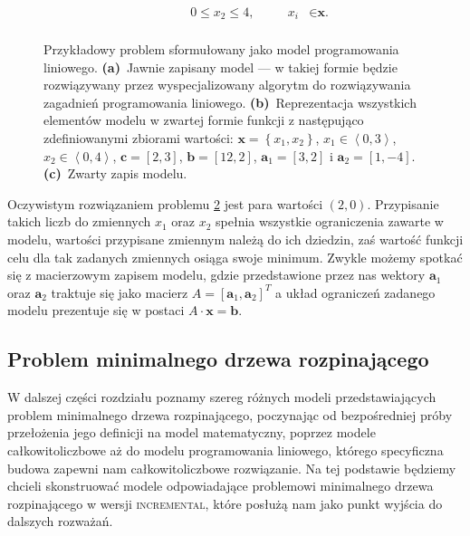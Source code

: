 \begin{figure}[!htbp]
\begin{subfigure}[b]{0.3\textwidth}
\begin{subequations}
\begin{alignat*}{4}
			& & & \phantom{\sum} 0 \leqslant x_{2} \leqslant 4, &\quad & x_{i} &\in \textbf{x}\textrm{.} \\
			\end{alignat*}
		\end{subequations}
		\caption{}
		\label{fig:lpexample:c}
	\end{subfigure}
	\hfill\null
	\caption{
		Przykładowy problem sformułowany jako model programowania liniowego.
		\textbf{(a)}~Jawnie zapisany model --- w takiej formie będzie rozwiązywany przez wyspecjalizowany algorytm do rozwiązywania zagadnień programowania liniowego.
		\textbf{(b)}~Reprezentacja wszystkich elementów modelu w zwartej formie funkcji z następująco zdefiniowanymi zbiorami wartości: $\textbf{x} = \left\{ x_{1}, x_{2} \right\}$, $x_{1} \in \left\langle 0, 3 \right\rangle$, $x_{2} \in \left\langle 0, 4 \right\rangle$, $\textbf{c} = \left[ 2, 3 \right]$, $\textbf{b} = \left[ 12, 2 \right]$, $\textbf{a}_{1} = \left[ 3, 2 \right]$ i $\textbf{a}_{2} = \left[ 1, -4 \right]$.
		\textbf{(c)}~Zwarty zapis modelu.
	}
	\label{fig:lpexample}
\end{figure}

Oczywistym rozwiązaniem problemu \ref{fig:lpexample} jest para wartości $\left( 2, 0 \right)$. Przypisanie takich liczb do zmiennych $x_{1}$ oraz $x_{2}$ spełnia wszystkie ograniczenia zawarte w modelu, wartości przypisane zmiennym należą do ich dziedzin, zaś wartość funkcji celu dla tak zadanych zmiennych osiąga swoje minimum. Zwykle możemy spotkać się z macierzowym zapisem modelu, gdzie przedstawione przez nas wektory $\textbf{a}_{1}$ oraz $\textbf{a}_{2}$ traktuje się jako macierz $A = \left[ \textbf{a}_{1}, \textbf{a}_{2} \right]^{T}$ a układ ograniczeń zadanego modelu prezentuje się w postaci $A \cdot \textbf{x} = \textbf{b}$.

\subsection{Problem minimalnego drzewa rozpinającego}

W dalszej części rozdziału poznamy szereg różnych modeli przedstawiających problem minimalnego drzewa rozpinającego, poczynając od bezpośredniej próby przełożenia jego definicji na model matematyczny, poprzez modele całkowitoliczbowe aż do modelu programowania liniowego, którego specyficzna budowa zapewni nam całkowitoliczbowe rozwiązanie. Na tej podstawie będziemy chcieli skonstruować modele odpowiadające problemowi minimalnego drzewa rozpinającego w wersji \textsc{incremental}, które posłużą nam jako punkt wyjścia do dalszych rozważań.

